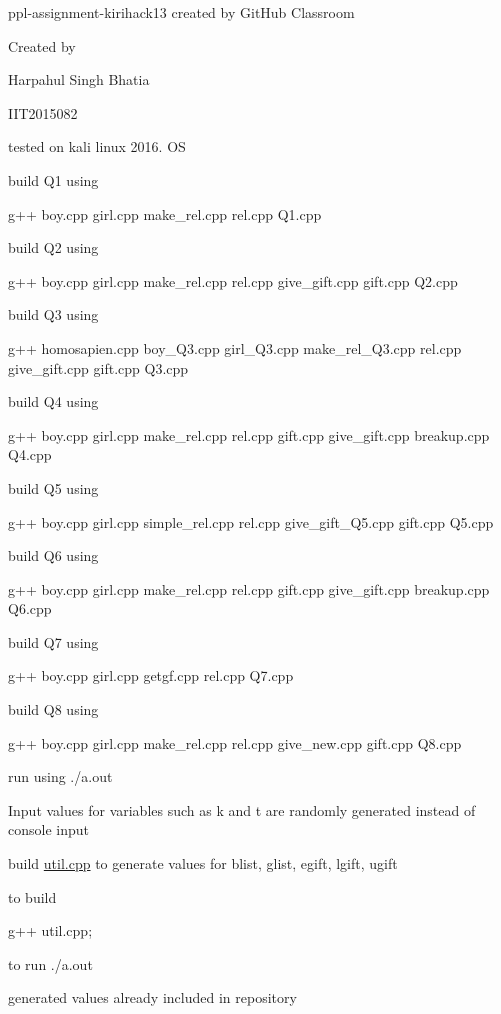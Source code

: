 ppl-\/assignment-\/kirihack13 created by Git\+Hub Classroom

Created by \begin{DoxyVerb}Harpahul Singh Bhatia

IIT2015082
\end{DoxyVerb}


tested on kali linux 2016. OS

build Q1 using \begin{DoxyVerb}g++ boy.cpp girl.cpp make_rel.cpp rel.cpp Q1.cpp
\end{DoxyVerb}


build Q2 using \begin{DoxyVerb}g++ boy.cpp girl.cpp make_rel.cpp rel.cpp give_gift.cpp gift.cpp Q2.cpp
\end{DoxyVerb}


build Q3 using \begin{DoxyVerb}g++ homosapien.cpp boy_Q3.cpp girl_Q3.cpp make_rel_Q3.cpp rel.cpp give_gift.cpp gift.cpp Q3.cpp
\end{DoxyVerb}


build Q4 using \begin{DoxyVerb}g++ boy.cpp girl.cpp make_rel.cpp rel.cpp gift.cpp give_gift.cpp breakup.cpp Q4.cpp 
\end{DoxyVerb}


build Q5 using \begin{DoxyVerb}g++ boy.cpp girl.cpp simple_rel.cpp rel.cpp give_gift_Q5.cpp gift.cpp Q5.cpp
\end{DoxyVerb}


build Q6 using \begin{DoxyVerb}g++ boy.cpp girl.cpp make_rel.cpp rel.cpp gift.cpp give_gift.cpp breakup.cpp Q6.cpp
\end{DoxyVerb}


build Q7 using \begin{DoxyVerb}g++ boy.cpp girl.cpp getgf.cpp rel.cpp Q7.cpp
\end{DoxyVerb}


build Q8 using \begin{DoxyVerb}g++ boy.cpp girl.cpp make_rel.cpp rel.cpp give_new.cpp gift.cpp Q8.cpp
\end{DoxyVerb}


run using ./a.out

Input values for variables such as k and t are randomly generated instead of console input

build \hyperlink{util_8cpp}{util.\+cpp} to generate values for blist, glist, egift, lgift, ugift

to build \begin{DoxyVerb}g++ util.cpp;
\end{DoxyVerb}


to run ./a.out

generated values already included in repository 